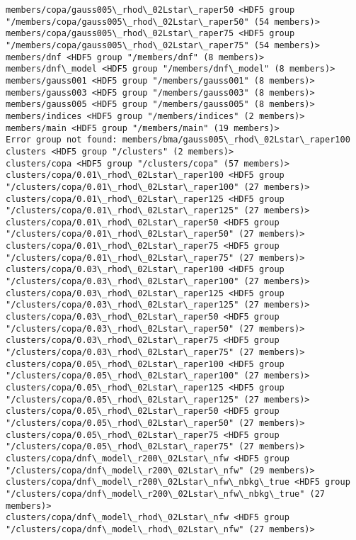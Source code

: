 \documentclass[11pt]{article}
\begin{document}
\begin{Verbatim}[commandchars=\\\{\}]
members/copa/gauss005\_rhod\_02Lstar\_raper50 <HDF5 group "/members/copa/gauss005\_rhod\_02Lstar\_raper50" (54 members)>
members/copa/gauss005\_rhod\_02Lstar\_raper75 <HDF5 group "/members/copa/gauss005\_rhod\_02Lstar\_raper75" (54 members)>
members/dnf <HDF5 group "/members/dnf" (8 members)>
members/dnf\_model <HDF5 group "/members/dnf\_model" (8 members)>
members/gauss001 <HDF5 group "/members/gauss001" (8 members)>
members/gauss003 <HDF5 group "/members/gauss003" (8 members)>
members/gauss005 <HDF5 group "/members/gauss005" (8 members)>
members/indices <HDF5 group "/members/indices" (2 members)>
members/main <HDF5 group "/members/main" (19 members)>
Error group not found: members/bma/gauss005\_rhod\_02Lstar\_raper100
clusters <HDF5 group "/clusters" (2 members)>
clusters/copa <HDF5 group "/clusters/copa" (57 members)>
clusters/copa/0.01\_rhod\_02Lstar\_raper100 <HDF5 group "/clusters/copa/0.01\_rhod\_02Lstar\_raper100" (27 members)>
clusters/copa/0.01\_rhod\_02Lstar\_raper125 <HDF5 group "/clusters/copa/0.01\_rhod\_02Lstar\_raper125" (27 members)>
clusters/copa/0.01\_rhod\_02Lstar\_raper50 <HDF5 group "/clusters/copa/0.01\_rhod\_02Lstar\_raper50" (27 members)>
clusters/copa/0.01\_rhod\_02Lstar\_raper75 <HDF5 group "/clusters/copa/0.01\_rhod\_02Lstar\_raper75" (27 members)>
clusters/copa/0.03\_rhod\_02Lstar\_raper100 <HDF5 group "/clusters/copa/0.03\_rhod\_02Lstar\_raper100" (27 members)>
clusters/copa/0.03\_rhod\_02Lstar\_raper125 <HDF5 group "/clusters/copa/0.03\_rhod\_02Lstar\_raper125" (27 members)>
clusters/copa/0.03\_rhod\_02Lstar\_raper50 <HDF5 group "/clusters/copa/0.03\_rhod\_02Lstar\_raper50" (27 members)>
clusters/copa/0.03\_rhod\_02Lstar\_raper75 <HDF5 group "/clusters/copa/0.03\_rhod\_02Lstar\_raper75" (27 members)>
clusters/copa/0.05\_rhod\_02Lstar\_raper100 <HDF5 group "/clusters/copa/0.05\_rhod\_02Lstar\_raper100" (27 members)>
clusters/copa/0.05\_rhod\_02Lstar\_raper125 <HDF5 group "/clusters/copa/0.05\_rhod\_02Lstar\_raper125" (27 members)>
clusters/copa/0.05\_rhod\_02Lstar\_raper50 <HDF5 group "/clusters/copa/0.05\_rhod\_02Lstar\_raper50" (27 members)>
clusters/copa/0.05\_rhod\_02Lstar\_raper75 <HDF5 group "/clusters/copa/0.05\_rhod\_02Lstar\_raper75" (27 members)>
clusters/copa/dnf\_model\_r200\_02Lstar\_nfw <HDF5 group "/clusters/copa/dnf\_model\_r200\_02Lstar\_nfw" (29 members)>
clusters/copa/dnf\_model\_r200\_02Lstar\_nfw\_nbkg\_true <HDF5 group "/clusters/copa/dnf\_model\_r200\_02Lstar\_nfw\_nbkg\_true" (27 members)>
clusters/copa/dnf\_model\_rhod\_02Lstar\_nfw <HDF5 group "/clusters/copa/dnf\_model\_rhod\_02Lstar\_nfw" (27 members)>

\end{Verbatim}
\end{document}
